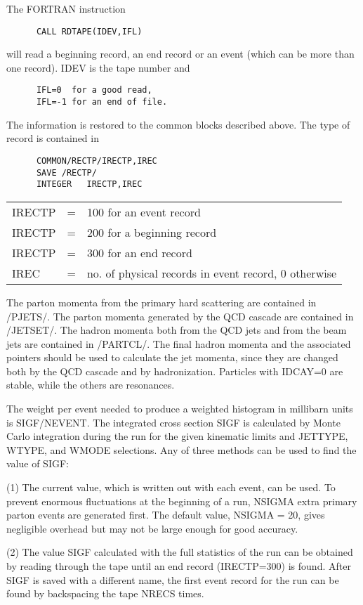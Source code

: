       The FORTRAN instruction
\begin{verbatim}
      CALL RDTAPE(IDEV,IFL)
\end{verbatim}
will read a beginning record, an end record or an event (which can be
more than one record). IDEV is the tape number and
\begin{verbatim}
      IFL=0  for a good read,
      IFL=-1 for an end of file.
\end{verbatim}
The information is restored to the common blocks described above. The
type of record is contained in
\begin{verbatim}
      COMMON/RECTP/IRECTP,IREC
      SAVE /RECTP/
      INTEGER   IRECTP,IREC
\end{verbatim}
\begin{tabular}{lcl}
IRECTP            &=& 100 for an event record\\
IRECTP            &=& 200 for a beginning record\\
IRECTP            &=& 300 for an end record\\
IREC              &=& no. of physical records in event record, 0 
                      otherwise\\
\end{tabular}

      The parton momenta from the primary hard scattering are
contained in /PJETS/. The parton momenta generated by the QCD cascade
are contained in /JETSET/. The hadron momenta both from the QCD jets
and from the beam jets are contained in /PARTCL/. The final hadron
momenta and the associated pointers should be used to calculate the
jet momenta, since they are changed both by the QCD cascade and by
hadronization. Particles with IDCAY=0 are stable, while the others are
resonances.

      The weight per event needed to produce a weighted histogram in
millibarn units is SIGF/NEVENT. The integrated cross section SIGF is
calculated by Monte Carlo integration during the run for the given
kinematic limits and JETTYPE, WTYPE, and WMODE selections. Any of three
methods can be used to find the value of SIGF:

      (1) The current value, which is written out with each event, can
be used. To prevent enormous fluctuations at the beginning of a run,
NSIGMA extra primary parton events are generated first. The default
value, NSIGMA = 20, gives negligible overhead but may not be large
enough for good accuracy.

      (2) The value SIGF calculated with the full statistics of the run
can be obtained by reading through the tape until an end record
(IRECTP=300) is found. After SIGF is saved with a different name, the
first event record for the run can be found by backspacing the tape
NRECS times.

